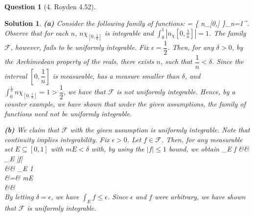 \documentclass{article} %
\def\eQb#1\eQe{\begin{eqnarray*}#1\end{eqnarray*}}
\theoremstyle{quest}
\newtheorem*{question}{Question}
\newtheorem*{solution}{Solution}
\begin{document}
\bigskip

\begin{question}[4. Royden 4.52]
\end{question}
\begin{solution}
\textbf{(a)} Consider the following family of functions:
\eQb
\mathscr{F} = \{ n\chi_{[0,]} 
\}_{n=1}^{\infty}. 
\eQe
Observe that for each $n$, $n\chi_{[0,\frac{1}{n}]}$ is 
integrable and $\int_{0}^{1} |n_\chi{[0,\frac{1}{n}]}| = 1$.
The family $\mathscr{F}$, however, fails to be uniformly integrable.
Fix $\epsilon = \dfrac{1}{2}$. Then, for any $\delta > 0$, by the 
Archimedean property of the reals, there exists $n$, such that
$\dfrac{1}{n} < \delta$. Since the interval $[0,\dfrac{1}{n}]$ 
is measurable, has a measure smaller than $\delta$, and 
$\int_{0}^{\frac{1}{n}} n\chi_{[0,\frac{1}{n}]} = 1 > \dfrac{1}{2}$, 
we have that $\mathscr{F}$ is not uniformly integrable. Hence, by
a counter example, we have shown that under the given assumptions,
the family of functions need not be uniformly integrable. 

\smallskip

\textbf{(b)} We claim that $\mathscr{F}$ with the given assumption
is uniformly integrable. Note that continuity implies integrability.
Fix $\epsilon > 0$. 
Let $f \in \mathscr{F}$. 
Then, for any measurable set $E \subseteq [0,1]$ with
$mE < \delta$ with, by using the $|f| \leq 1$ bound, we obtain 
\eQb
\int_{E} f &\leq& \int_{E} |f| \\
&\leq& \int_{E} 1 \\
&=& mE \\
&\leq& \delta \\
\eQe
By letting $\delta = \epsilon$, we have $\int_{E} f \leq \epsilon$.
Since $\epsilon$ and $f$ were arbitrary, we have shown that
$\mathscr{F}$ is uniformly integrable. 

\smallskip


\end{solution}
\end{document}
